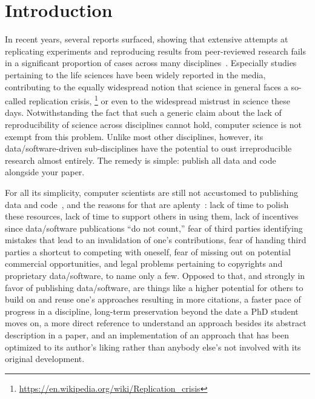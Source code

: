 \section{Introduction}

In recent years, several reports surfaced, showing that extensive attempts at replicating experiments and reproducing results from peer-reviewed research fails in a significant proportion of cases across many disciplines~\cite{ionnadis:2005,anderson:2017}. Especially studies pertaining to the life sciences have been widely reported in the media, contributing to the equally widespread notion that science in general faces a so-called replication crisis,%
\footnote{\scriptsize\url{https://en.wikipedia.org/wiki/Replication_crisis}}
or even to the widespread mistrust in science these days. Notwithstanding the fact that such a generic claim about the lack of reproducibility of science across disciplines cannot hold, computer science is not exempt from this problem. Unlike most other disciplines, however, its data/software-driven sub-disciplines have the potential to oust irreproducible research almost entirely. The remedy is simple: publish all data and code alongside your paper.

For all its simplicity, computer scientists are still not accustomed to publishing data and code~\cite{collberg:2015}, and the reasons for that are aplenty~\cite{stodden:2010}: lack of time to polish these resources, lack of time to support others in using them, lack of incentives since data/software publications ``do not count,'' fear of third parties identifying mistakes that lead to an invalidation of one's contributions, fear of handing third parties a shortcut to competing with oneself, fear of missing out on potential commercial opportunities, and legal problems pertaining to copyrights and proprietary data/software, to name only a few.
Opposed to that, and strongly in favor of publishing data/software, are things like a higher potential for others to build on and reuse one's approaches resulting in more citations, a faster pace of progress in a discipline, long-term preservation beyond the date a PhD student moves on, a more direct reference to understand an approach besides its abstract description in a paper, and an implementation of an approach that has been optimized to its author's liking rather than anybody else's not involved with its original development.

